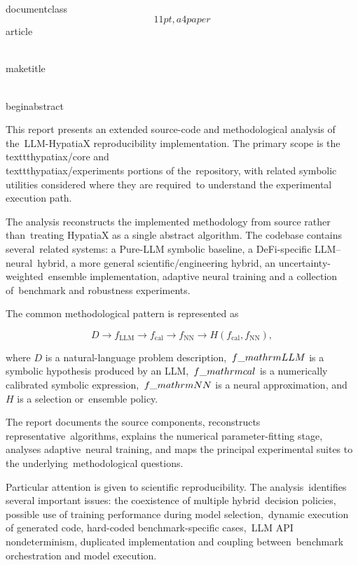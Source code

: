 \\documentclass\[11pt,a4paper\]{article}
\begin{document}
 \\maketitle

 \\begin{abstract}

 This report presents an extended source-code and methodological analysis of the\
 LLM-HypatiaX reproducibility implementation. The primary scope is the\
 \\texttt{hypatiax/core} and \\texttt{hypatiax/experiments} portions of the\
 repository, with related symbolic utilities considered where they are required\
 to understand the experimental execution path.

 The analysis reconstructs the implemented methodology from source rather than\
 treating HypatiaX as a single abstract algorithm. The codebase contains several\
 related systems: a Pure-LLM symbolic baseline, a DeFi-specific LLM--neural\
 hybrid, a more general scientific/engineering hybrid, an uncertainty-weighted\
 ensemble implementation, adaptive neural training and a collection of\
 benchmark and robustness experiments.

 The common methodological pattern is represented as

 $$
D
\rightarrow
f_{\mathrm{LLM}}
\rightarrow
f_{\mathrm{cal}}
\rightarrow
f_{\mathrm{NN}}
\rightarrow
H(f_{\mathrm{cal}},f_{\mathrm{NN}}),
$$

 where $D$ is a natural-language problem description,\
 $f\_{\\mathrm{LLM}}$ is a symbolic hypothesis produced by an LLM,\
 $f\_{\\mathrm{cal}}$ is a numerically calibrated symbolic expression,\
 $f\_{\\mathrm{NN}}$ is a neural approximation, and $H$ is a selection or\
 ensemble policy.

 The report documents the source components, reconstructs representative\
 algorithms, explains the numerical parameter-fitting stage, analyses adaptive\
 neural training, and maps the principal experimental suites to the underlying\
 methodological questions.

 Particular attention is given to scientific reproducibility. The analysis\
 identifies several important issues: the coexistence of multiple hybrid\
 decision policies, possible use of training performance during model selection,\
 dynamic execution of generated code, hard-coded benchmark-specific cases,\
 LLM API nondeterminism, duplicated implementation and coupling between\
 benchmark orchestration and model execution.
\end{document}
